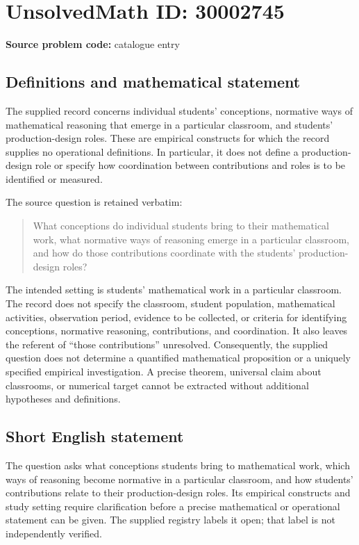 \documentclass[11pt]{article}
\begin{document}
\section*{UnsolvedMath ID: 30002745}
\textbf{Source problem code:} catalogue entry
\subsection{Definitions and mathematical statement}
The supplied record concerns individual students' conceptions, normative ways of mathematical reasoning that emerge in a particular classroom, and students' production-design roles. These are empirical constructs for which the record supplies no operational definitions. In particular, it does not define a production-design role or specify how coordination between contributions and roles is to be identified or measured.

The source question is retained verbatim:
\begin{quote}
What conceptions do individual students bring to their mathematical work, what normative ways of reasoning emerge in a particular classroom, and how do those contributions coordinate with the students' production-design roles?
\end{quote}

The intended setting is students' mathematical work in a particular classroom. The record does not specify the classroom, student population, mathematical activities, observation period, evidence to be collected, or criteria for identifying conceptions, normative reasoning, contributions, and coordination. It also leaves the referent of ``those contributions'' unresolved. Consequently, the supplied question does not determine a quantified mathematical proposition or a uniquely specified empirical investigation. A precise theorem, universal claim about classrooms, or numerical target cannot be extracted without additional hypotheses and definitions.
\subsection{Short English statement}
The question asks what conceptions students bring to mathematical work, which ways of reasoning become normative in a particular classroom, and how students' contributions relate to their production-design roles. Its empirical constructs and study setting require clarification before a precise mathematical or operational statement can be given. The supplied registry labels it open; that label is not independently verified.
\end{document}
